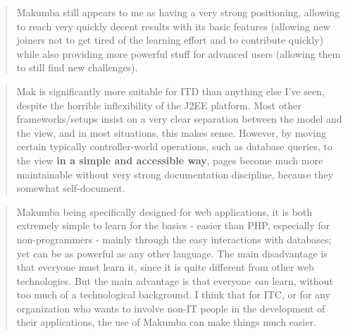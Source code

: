 \documentclass{acm_proc_article-sp}
\begin{document}

\begin{quotation}
	Makumba still appears to me as having a very strong positioning, allowing to reach very quickly decent results with its basic features (allowing new joiners not to get tired of the learning effort and to contribute quickly) while also providing more powerful stuff for advanced users (allowing them to still find new challenges). 
\end{quotation}

\begin{quotation}
	Mak is significantly more suitable for ITD than anything else I've seen, despite the horrible inflexibility of the J2EE platform. Most other frameworks/setups insist on a very clear separation between the model and the view, and in most situations, this makes sense. However, by moving certain typically controller-world operations, such as database queries, to the view \textbf{in a simple and accessible way}, pages become much more maintainable without very strong documentation discipline, because they somewhat self-document.
\end{quotation}

\begin{quotation}
	Makumba being specifically designed for web applications, it is both extremely simple to learn for the basics - easier than PHP, especially for non-programmers - mainly through the easy interactions with databases; yet can be as powerful as any other language. %
	The main disadvantage is that everyone must learn it, since it is quite different from other web technologies. But the main advantage is that everyone \textit{can} learn, without too much of a technological background. I think that for ITC, or for any organization who wants to involve non-IT people in the development of their applications, the use of Makumba can make things much easier.
\end{quotation}
\end{document}
